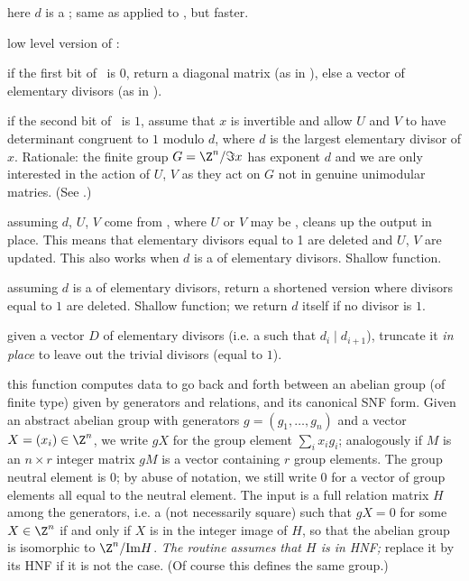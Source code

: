  here $d$ is a ; same as
 applied to , but faster.

 low level version of
:

\item if the first bit of \fl\ is $0$, return a diagonal matrix (as in
), else a vector of elementary divisors (as in
).

\item if the second bit of \fl\ is $1$, assume that $x$ is invertible
and allow $U$ and $V$ to have determinant congruent to $1$ modulo $d$,
where $d$ is the largest elementary divisor of $x$. Rationale: the finite
group $G = \Z^n/\Im x$ has exponent $d$ and we are only interested
in the action of $U$, $V$ as they act on $G$ not in genuine unimodular
matries. (See .)

 assuming $d$, $U$, $V$ come
from , where $U$ or $V$ may be ,
cleans up the output in place. This means that elementary divisors equal to 1
are deleted and $U$, $V$ are updated. This also works when $d$ is a 
of elementary divisors. Shallow function.

 assuming $d$ is a  of elementary
divisors, return a shortened version where divisors equal to $1$
are deleted. Shallow function; we return $d$ itself if no divisor is $1$.

 given a vector $D$ of elementary divisors
(i.e. a  such that $d_i \mid d_{i+1}$), truncate it \emph{in place}
to leave out the trivial divisors (equal to $1$).

 this function computes data
to go back and forth between an abelian group (of finite type) given by
generators and relations, and its canonical SNF form. Given an abstract
abelian group with generators $g = (g_1,\dots,g_n)$ and a vector
$X=(x_i)\in\Z^n$, we write $g X$ for the group element $\sum_i x_i g_i$;
analogously if $M$ is an $n\times r$ integer matrix $g M$ is a vector
containing $r$ group elements. The group neutral element is $0$; by abuse of
notation, we still write $0$ for a vector of group elements all equal to the
neutral element. The input is a full relation matrix $H$ among the
generators, i.e. a  (not necessarily square) such that $gX = 0$ for
some $X\in\Z^n$ if and only if $X$ is in the integer image of $H$, so that
the abelian group is isomorphic to $\Z^n/\text{Im} H$. \emph{The routine
assumes that $H$ is in HNF;} replace it by its HNF if it is not the case. (Of
course this defines the same group.)


